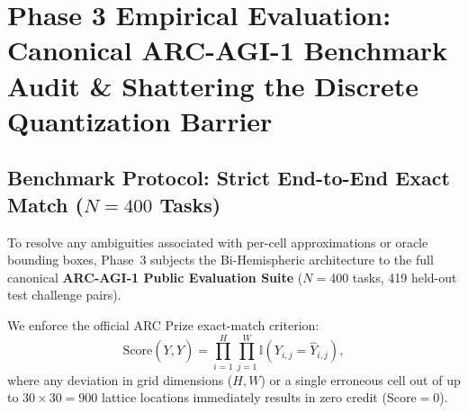 \documentclass[11pt,a4paper]{article}
\theoremstyle{plain}
\theoremstyle{definition}
\theoremstyle{remark}
\begin{document}
\section{Phase 3 Empirical Evaluation: Canonical ARC-AGI-1 Benchmark Audit \& Shattering the Discrete Quantization Barrier}
\label{sec:phase3_canonical}

\subsection{Benchmark Protocol: Strict End-to-End Exact Match ($N = 400$ Tasks)}

To resolve any ambiguities associated with per-cell approximations or oracle bounding boxes, Phase~3 subjects the Bi-Hemispheric architecture to the full canonical \textbf{ARC-AGI-1 Public Evaluation Suite} ($N = 400$ tasks, 419 held-out test challenge pairs). 

We enforce the official ARC Prize exact-match criterion:
\begin{equation}
    \mathrm{Score}(Y, \hat{Y}) = \prod_{i=1}^{H} \prod_{j=1}^{W} \mathbb{I}\left(Y_{i,j} = \hat{Y}_{i,j}\right),
\end{equation}
where any deviation in grid dimensions ($H, W$) or a single erroneous cell out of up to $30 \times 30 = 900$ lattice locations immediately results in zero credit ($\mathrm{Score} = 0$).
\end{document}
